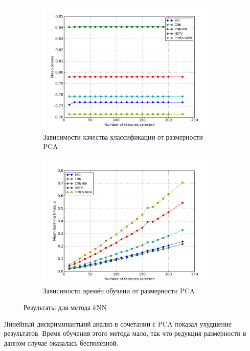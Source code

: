 \begin{figure}[h!]
    \centering
	\begin{subfigure}{0.45\textwidth}
		\includegraphics[width=\textwidth]{images/PCA-kNN.png}
		\caption{Зависимости качества классификации от размерности PCA}
	\end{subfigure}
	\begin{subfigure}{0.45\textwidth}
		\includegraphics[width=\textwidth]{images/PCA-kNNTime.png}
		\caption{Зависимости времён обучени от размерности PCA}
	\end{subfigure}
	\caption{Результаты для метода \(k\)NN}\label{fig:knn_pca}
\end{figure}

\par
Линейный дискриминантынй анализ в сочетании с PCA показал ухудшение результатов. Время обучения этого метода мало, так что редукция размерности в данном случае оказалась бесполезной.

